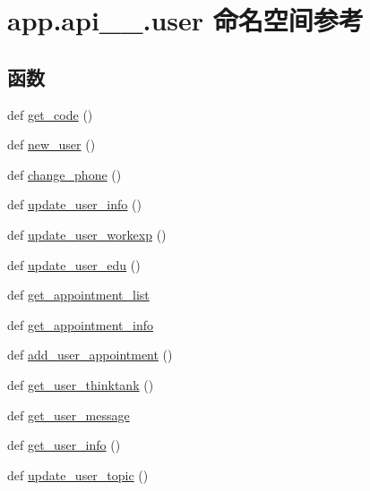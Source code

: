 \hypertarget{namespaceapp_1_1api__1__0_1_1user}{}\section{app.\+api\+\_\+\_.\+user 命名空间参考}
\label{namespaceapp_1_1api__1__0_1_1user}
\subsection*{函数}
\begin{DoxyCompactItemize}
\item 
def \hyperlink{namespaceapp_1_1api__1__0_1_1user_aaa1dafab3a77326e0392cf339082e647}{get\+\_\+code} ()
\item 
def \hyperlink{namespaceapp_1_1api__1__0_1_1user_a55691ec00cfa22b8722440ac1c0e5488}{new\+\_\+user} ()
\item 
def \hyperlink{namespaceapp_1_1api__1__0_1_1user_a3decbd5fa1b9c12c3c07f4fd24c9334d}{change\+\_\+phone} ()
\item 
def \hyperlink{namespaceapp_1_1api__1__0_1_1user_a112fe5de3606f23f630ad74b003c3793}{update\+\_\+user\+\_\+info} ()
\item 
def \hyperlink{namespaceapp_1_1api__1__0_1_1user_a0bfdfa2ffc75a64ccceb916fecf3ca4e}{update\+\_\+user\+\_\+workexp} ()
\item 
def \hyperlink{namespaceapp_1_1api__1__0_1_1user_a8717211160238bc1ebc8017125817a3b}{update\+\_\+user\+\_\+edu} ()
\item 
def \hyperlink{namespaceapp_1_1api__1__0_1_1user_ac5e8e848c1b276331fd4973c7cceebc0}{get\+\_\+appointment\+\_\+list}
\item 
def \hyperlink{namespaceapp_1_1api__1__0_1_1user_a612d69aae95b49b644832971825b8c0b}{get\+\_\+appointment\+\_\+info}
\item 
def \hyperlink{namespaceapp_1_1api__1__0_1_1user_ad6c1e946dc1153f1dbc267d309135dea}{add\+\_\+user\+\_\+appointment} ()
\item 
def \hyperlink{namespaceapp_1_1api__1__0_1_1user_a7c088bb5f7150ff7ea87f1ddea02ba5e}{get\+\_\+user\+\_\+thinktank} ()
\item 
def \hyperlink{namespaceapp_1_1api__1__0_1_1user_a5024fd93f333168232806a99ad6cbbd4}{get\+\_\+user\+\_\+message}
\item 
def \hyperlink{namespaceapp_1_1api__1__0_1_1user_aa9a18cd0a720a6b498b2bd35be03ea4e}{get\+\_\+user\+\_\+info} ()
\item 
def \hyperlink{namespaceapp_1_1api__1__0_1_1user_aba3f803f01094c46bab3a2537f5a0e1b}{update\+\_\+user\+\_\+topic} ()

\end{DoxyCompactItemize}
